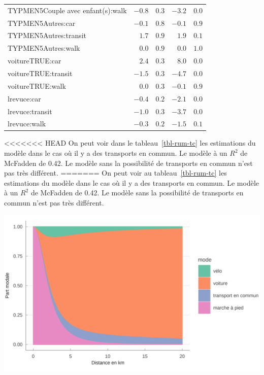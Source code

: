 \documentclass[
  9pt,
  a4paper,
  DIV=11]{scrreprt}
\begin{document}
\begin{longtable}{lrrrr}
TYPMEN5Couple avec enfant(s):walk & $-0.8$ & $0.3$ & $-3.2$ & $0.0$ \\ 
TYPMEN5Autres:car & $-0.1$ & $0.8$ & $-0.1$ & $0.9$ \\ 
TYPMEN5Autres:transit & $1.7$ & $0.9$ & $1.9$ & $0.1$ \\ 
TYPMEN5Autres:walk & $0.0$ & $0.9$ & $0.0$ & $1.0$ \\ 
voitureTRUE:car & $2.4$ & $0.3$ & $8.0$ & $0.0$ \\ 
voitureTRUE:transit & $-1.5$ & $0.3$ & $-4.7$ & $0.0$ \\ 
voitureTRUE:walk & $0.0$ & $0.3$ & $-0.1$ & $0.9$ \\ 
lrevuce:car & $-0.4$ & $0.2$ & $-2.1$ & $0.0$ \\ 
lrevuce:transit & $-1.0$ & $0.3$ & $-3.7$ & $0.0$ \\ 
lrevuce:walk & $-0.3$ & $0.2$ & $-1.5$ & $0.1$ \\ 
\bottomrule

\end{longtable}

\textless\textless\textless\textless\textless\textless\textless{} HEAD
On peut voir dans le tableau~\ref{tbl-rum-tc} les estimations du modèle
dans le cas où il y a des transports en commun. Le modèle à un \(R^2\)
de McFadden de 0.42. Le modèle sans la possibilité de transports en
commun n'est pas très différent. ======= On peut voir au
tableau~\ref{tbl-rum-tc} les estimations du modèle dans le cas où il y a
des transports en commun. Le modèle à un \(R^2\) de McFadden de 0.42. Le
modèle sans la possibilité de transports en commun n'est pas très
différent.

\includegraphics[width=1\textwidth,height=\textheight]{trajets_files/figure-pdf/unnamed-chunk-9-1.png}
\end{document}
